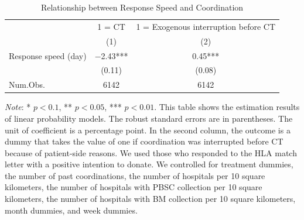 \documentclass [12pt, a4paper]{article}
\begin{document}
\begin{table}[H]

\caption{\label{tab:response-speed-CT}Relationship between Response Speed and Coordination}
\centering
\fontsize{9}{11}\selectfont
\begin{threeparttable}
\begin{tabular}[t]{lcc}
\toprule
\multicolumn{1}{c}{ } & \multicolumn{1}{c}{1 = CT} & \multicolumn{1}{c}{1 = Exogenous interruption before CT} \\
\cmidrule(l{3pt}r{3pt}){2-2} \cmidrule(l{3pt}r{3pt}){3-3}
  & (1) & (2)\\
\midrule
Response speed (day) & \num{-2.43}*** & \num{0.45}***\\
 & (\num{0.11}) & (\num{0.08})\\
\midrule
Num.Obs. & \num{6142} & \num{6142}\\
\bottomrule
\end{tabular}
\begin{tablenotes}
\item \emph{Note}: * $p < 0.1$, ** $p < 0.05$, *** $p < 0.01$. This table shows the estimation results of linear probability models. The robust standard errors are in parentheses. The unit of coefficient is a percentage point. In the second column, the outcome is a dummy that takes the value of one if coordination was interrupted before CT because of patient-side reasons.  We used those who responded to the HLA match letter with a positive intention to donate. We controlled for treatment dummies, the number of past coordinations, the number of hospitals per 10 square kilometers, the number of hospitals with PBSC collection per 10 square kilometers, the number of hospitals with BM collection per 10 square kilometers, month dummies, and week dummies.
\end{tablenotes}
\end{threeparttable}
\end{table}
\end{document}
